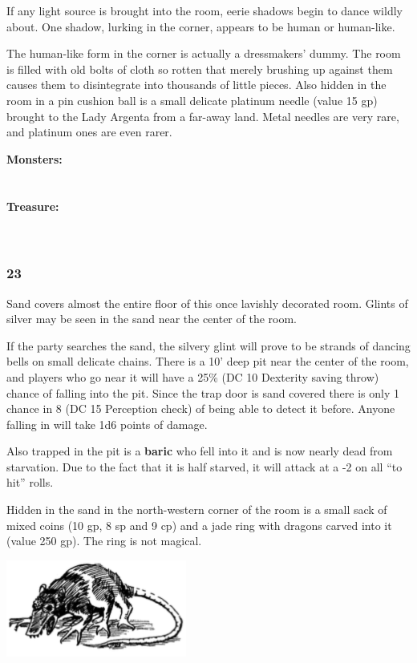\documentclass[palace_of_the_silver_princess]{subfiles}
\begin{document}
If any light source is brought into the room, eerie shadows begin to
dance wildly about. One shadow, lurking in the corner, appears to be
human or human-like.

The human-like form in the corner is actually a dressmakers’ dummy. The
room is filled with old bolts of cloth so rotten that merely brushing up
against them causes them to disintegrate into thousands of little
pieces. Also hidden in the room in a pin cushion ball is a small
delicate platinum needle (value 15 gp) brought to the Lady Argenta from
a far-away land. Metal needles are very rare, and platinum ones are
even rarer.

\textbf{Monsters:}
\\
\\
\\
\textbf{Treasure:}
\\
\\
\\

\subsubsection{23}
\begin{quotebox}
    Sand covers almost the entire floor of this once lavishly decorated
    room. Glints of silver may be seen in the sand near the center of
    the room.
\end{quotebox}

If the party searches the sand, the silvery glint will prove to be
strands of dancing bells on small delicate chains. There is a 10’ deep
pit near the center of the room, and players who go near it will have a
25\% (DC 10 Dexterity saving throw) chance of falling into the pit.
Since the trap door is sand covered there is only 1 chance in 8 (DC 15
Perception check) of being able to detect it before. Anyone falling in
will take 1d6 points of damage.

Also trapped in the pit is a \textbf{baric} who fell into it and is now
nearly dead from starvation. Due to the fact that it is half starved,
it will attack at a -2 on all “to hit” rolls.

Hidden in the sand in the north-western corner of the room is a small
sack of mixed coins (10 gp, 8 sp and 9 cp) and a jade ring with dragons
carved into it (value 250 gp). The ring is not magical.

\includegraphics[width=\columnwidth]{img/baric.png}
\end{document}
